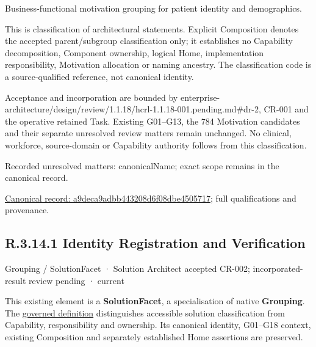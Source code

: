 Business-functional motivation grouping for patient identity and demographics.



This is classification of architectural statements. Explicit Composition denotes the accepted parent/subgroup classification only; it establishes no Capability decomposition, Component ownership, logical Home, implementation responsibility, Motivation allocation or naming ancestry. The classification code is a source-qualified reference, not canonical identity.



Acceptance and incorporation are bounded by enterprise-architecture/design/review/1.1.18/hcrl-1.1.18-001.pending.md\#dr-2, CR-001 and the operative retained Task. Existing G01–G13, the 784 Motivation candidates and their separate unresolved review matters remain unchanged. No clinical, workforce, source-domain or Capability authority follows from this classification.


{\small Recorded unresolved matters: canonicalName; exact scope remains in the canonical record.}\par
{\footnotesize \href{../../../../../../../continuum/grouping/a9deca9adbb443208d6f08dbe4505717.md}{Canonical record: a9deca9adbb443208d6f08dbe4505717}; full qualifications and provenance.}\par
\subsection*{R.3.14.1 Identity Registration and Verification}
\label{navigation:R.3.14.1}

\label{element:5fcada54e6df40a8983335a90e4a9f02}
{\small Grouping / SolutionFacet · Solution Architect accepted CR-002; incorporated-result review pending · current}\par

This existing element is a \textbf{SolutionFacet}, a specialisation of native
\textbf{Grouping}. The \href{\detokenize{../../../../../../../governance/continuum-representation.md#solutionfacet-classification--1119-candidate}}{governed definition}
distinguishes accessible solution classification from Capability, responsibility
and ownership. Its canonical identity, G01–G18 context, existing Composition
and separately established Home assertions are preserved.



